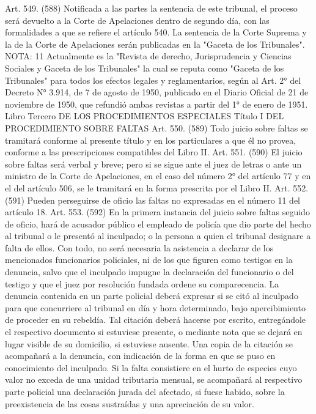     Art. 549. (588) Notificada a las partes la sentencia de este tribunal, el proceso será devuelto a la Corte de Apelaciones dentro de segundo día, con las formalidades a que se refiere el artículo 540.
    La sentencia de la Corte Suprema y la de la Corte de Apelaciones serán publicadas en la "Gaceta de los Tribunales".
NOTA:  11
    Actualmente es la "Revista de derecho, Jurisprudencia y Ciencias Sociales y Gaceta de los Tribunales" la cual se reputa como "Gaceta de los Tribunales" para todos los efectos legales y reglamentarios, según al Art. 2° del Decreto N° 3.914, de 7 de agosto de 1950, publicado en el Diario Oficial de 21 de noviembre de 1950, que refundió ambas revistas a partir del 1° de enero de 1951.
    Libro Tercero
    DE LOS PROCEDIMIENTOS ESPECIALES
    Título I
    DEL PROCEDIMIENTO SOBRE FALTAS
    Art. 550. (589) Todo juicio sobre faltas se tramitará conforme al presente título y en los particulares a que él no provea, conforme a las prescripciones compatibles del Libro II.
    Art. 551. (590) El juicio sobre faltas será verbal y breve; pero si se sigue ante el juez de letras o ante un ministro de la Corte de Apelaciones, en el caso del número 2° del artículo 77 y en el del artículo 506, se le tramitará en la forma prescrita por el Libro II.
    Art. 552. (591) Pueden perseguirse de oficio las faltas no expresadas en el número 11 del artículo 18.
    Art. 553. (592) En la primera instancia del juicio sobre faltas seguido de oficio, hará de acusador público el empleado de policía que dio parte del hecho al tribunal o le presentó al inculpado; o la persona a quien el tribunal designare a falta de ellos.
    Con todo, no será necesaria la asistencia a declarar de los mencionados funcionarios policiales, ni de los que figuren como testigos en la denuncia, salvo que el inculpado impugne la declaración del funcionario o del testigo y que el juez por resolución fundada ordene su comparecencia.
    La denuncia contenida en un parte policial deberá expresar si se citó al inculpado para que concurriere al tribunal en día y hora determinado, bajo apercibimiento de proceder en su rebeldía. Tal citación deberá hacerse por escrito, entregándole el respectivo documento si estuviese presente, o mediante nota que se dejará en lugar visible de su domicilio, si estuviese ausente. Una copia de la citación se acompañará a la denuncia, con indicación de la forma en que se puso en conocimiento del inculpado.
    Si la falta consistiere en el hurto de especies cuyo valor no exceda de una unidad tributaria mensual, se acompañará al respectivo parte policial una declaración jurada del afectado, si fuese habido, sobre la preexistencia de las cosas sustraídas y una apreciación de su valor.

